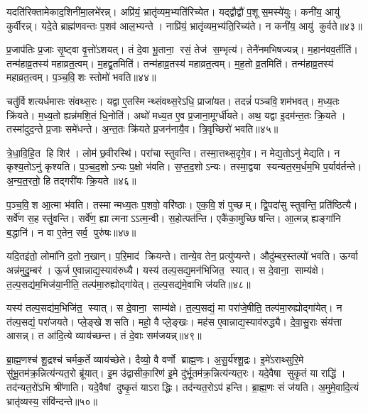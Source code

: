 यदति॑रिक्तामेकाद॒शिनी॑मा॒लभे॑रन्न्। अप्रि॑यं॒ भ्रातृ॑व्यम॒भ्यति॑रिच्येत। यद्द्वौद्वौ॑ प॒शू स॒मस्ये॑युः। कनी॑य॒ आयु॑ कुर्वीरन्न्। यदे॒ते ब्राह्म॑णवन्तः प॒शव॑ आल॒भ्यन्ते। नाप्रि॑यं॒ भ्रातृ॑व्यम॒भ्य॑ति॒रिच्य॑ते। न कनी॑य॒ आयु॑ कुर्वते॥४३॥\anuvakamend[ते ए॒वाल॑भन्ते मैत्रावरु॒णीमाल॑भ॒न्तेऽव॑रुद्ध्यै स॒प्त च॑]

प्र॒जाप॑तिः प्र॒जाः सृ॒ष्ट्वा वृ॒त्तो॑ऽशयत्। तं दे॒वा भू॒ताना॒ रसं॒ तेज॑ स॒म्भृत्य॑। तेनै॑नमभिषज्यन्न्। म॒हान॑वव॒र्तीति॑। तन्म॑हाव्र॒तस्य॑ महाव्रत॒त्वम्। म॒हद्व्र॒तमिति॑। तन्म॑हाव्र॒तस्य॑ महाव्रत॒त्वम्। म॒ह॒तो व्र॒तमिति॑। तन्म॑हाव्र॒तस्य॑ महाव्रत॒त्वम्। प॒ञ्च॒वि॒शः स्तोमो॑ भवति॥४४॥

चतु॑र्विशत्यर्धमासः संवथ्स॒रः। यद्वा ए॒तस्मिन्थ्संवथ्स॒रेऽधि॒ प्राजा॑यत। तदन्नं॑ पञ्चवि॒शम॑भवत्। म॒ध्य॒तः क्रि॑यते। म॒ध्य॒तो ह्यन्न॑मशि॒तं धि॒नोति॑। अथो॑ मध्य॒त ए॒व प्र॒जाना॒मूर्ग्धी॑यते। अथ॒ यद्वा इ॒दम॑न्त॒तः क्रि॒यते। तस्मा॑दुद॒न्ते प्र॒जाः समे॑धन्ते। अ॒न्त॒तः क्रि॑यते प्र॒जन॑नायै॒व। त्रि॒वृच्छिरो॑ भवति॥४५॥

त्रे॒धा॒वि॒हि॒त हि शिर॑। लोम॑ छ॒वीरस्थि॑। परा॑चा स्तुवन्ति। तस्मा॒त्तथ्स॒दृगे॒व। न मेद्य॒तोऽनु॑ मेद्यति। न कृश्य॒तोऽनु॑ कृश्यति। प॒ञ्च॒द॒शोऽन्यः प॒क्षो भ॑वति। स॒प्त॒द॒शोऽन्यः। तस्मा॒द्वया स्यन्यत॒रम॒र्धम॒भि प॒र्याव॑र्तन्ते। अ॒न्य॒त॒रतो॒ हि तद्गरी॑यः क्रि॒यते॥४६॥

प॒ञ्च॒वि॒श आ॒त्मा भ॑वति। तस्मान्मध्य॒तः प॒शवो॒ वरि॑ष्ठाः। ए॒क॒वि॒शं पुच्छम्। द्वि॒पदा॑सु स्तुवन्ति॒ प्रति॑ष्ठित्यै। सर्वे॑ण स॒ह स्तु॑वन्ति। सर्वे॑ण॒ ह्यात्मनाऽऽत्म॒न्वी। स॒होत्पत॑न्ति। एकै॑का॒मुच्छिषन्ति। आ॒त्मन्न् ह्यङ्गा॑नि ब॒द्धानि॑। न वा ए॒तेन॒ सर्व॒ पुरु॑षः॥४७॥

यदि॒तइ॑तो॒ लोमा॑नि द॒तो न॒खान्। प॒रि॒माद॑ क्रियन्ते। तान्ये॒व तेन॒ प्रत्यु॑प्यन्ते। औदु॑म्बर॒स्तल्पो॑ भवति। ऊर्ग्वा अन्न॑मुदु॒म्बर॑। ऊ॒र्ज ए॒वान्नाद्य॒स्याव॑रुध्यै। यस्य॑ तल्प॒सद्य॒मन॑भिजित॒ स्यात्। स दे॒वाना॒ साम्य॑क्षे। त॒ल्प॒सद्य॑म॒भिज॑या॒नीति॒ तल्प॑मा॒रुह्योद्गा॑येत्। त॒ल्प॒सद्य॑मे॒वाभि ज॑यति॥४८॥

यस्य॑ तल्प॒सद्य॑म॒भिजि॑त॒ स्यात्। स दे॒वाना॒ साम्य॑क्षे। त॒ल्प॒सद्यं॒ मा परा॑जे॒षीति॒ तल्प॑मा॒रुह्योद्गा॑येत्। न त॑ल्प॒सद्यं॒ परा॑जयते। प्ले॒ङ्खे शसति। महो॒ वै प्ले॒ङ्खः। मह॑स ए॒वान्नाद्य॒स्याव॑रुद्ध्यै। दे॒वा॒सु॒राः संय॑त्ता आसन्न्। त आ॑दि॒त्ये व्याय॑च्छन्त। तं दे॒वाः सम॑जयन्न्॥४९॥

ब्रा॒ह्म॒णश्च॑ शू॒द्रश्च॑ चर्मक॒र्ते व्याय॑च्छेते। दैव्यो॒ वै वर्णो ब्राह्म॒णः। अ॒सु॒र्य॑श्शू॒द्रः। इ॒मे॑ऽराथ्सुरि॒मे सु॑भू॒तम॑क्र॒न्नित्य॑न्यत॒रो ब्रू॑यात्। इ॒म उ॑द्वासीका॒रिण॑ इ॒मे दु॑र्भू॒तम॑क्र॒न्नित्य॑न्यत॒रः। यदे॒वैषा सुकृ॒तं या राद्धि॑। तद॑न्यत॒रो॑ऽभि श्री॑णाति। यदे॒वैषां दुष्कृ॒तं याऽराद्धिः। तद॑न्यत॒रोऽप॑ हन्ति। ब्रा॒ह्म॒णः सं ज॑यति। अ॒मुमे॒वादि॒त्यं भ्रातृ॑व्यस्य॒ संवि॑न्दन्ते॥५०॥


